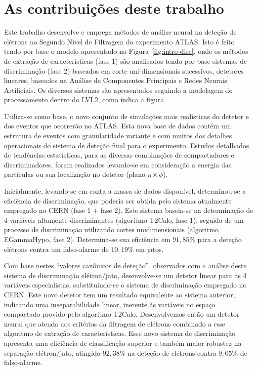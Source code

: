 \section{As contribuições deste trabalho}

Este trabalho desenvolve e emprega métodos de análise neural na deteção de
elétrons no Segundo Nível de Filtragem do experimento ATLAS. Isto é feito
tendo por base o modelo apresentado na Figura~\ref{fig:intro-disc}, onde os
métodos de extração de características (fase 1) são analisados tendo por base
sistemas de discriminação (fase 2) baseados em corte uni-dimensionais
sucessivos, detetores lineares, baseados na Análise de Componentes Principais
e Redes Neurais Artificiais. Os diversos sistemas são apresentados seguindo a
modelagem do processamento dentro do LVL2, como indica a figura.

Utiliza-se como base, o novo conjunto de simulações mais realísticas do
detetor e dos eventos que ocorrerão no ATLAS. Esta nova base de dados contém
um estrutura de eventos com granularidade variante e com muitos dos detalhes
operacionais do sistema de deteção final para o experimento. Estudos
detalhados de tendências estatísticas, para as diversas combinações de
compactadores e discriminadores, foram realizados levando-se em consideração a
energia das partículas ou sua localização no detetor (plano $\eta\times\phi$).

Inicialmente, levando-se em conta a massa de dados disponível, determinou-se a
eficiência de discriminação, que poderia ser obtida pelo sistema atualmente
empregado no CERN (fase 1 $+$ fase 2). Este sistema baseia-se na determinação
de 4 variáveis altamente discriminantes (algoritmo T2Calo, fase 1), seguido de
um processo de discriminação utilizando cortes unidimensionais (algoritmo
EGammaHypo, fase 2). Determina-se sua eficiência em $91,85\%$ para a deteção
elétrons contra um falso-alarme de $10,19\%$ em jatos.

Com base nestes ``valores canônicos de deteção'', observados com a análise
deste sistema de discriminação elétron/jato, desenvolve-se um detetor linear
para as 4 variáveis especialistas, substituindo-se o sistema de discriminação
 empregado no CERN. Este novo detetor tem um resultado
equivalente ao sistema anterior, indicando uma inseparabilidade linear,
inerente às variáveis no espaço compactado provido pelo algoritmo
T2Calo. Desenvolvemos então um detetor neural que atenda aos critérios da
filtragem de elétrons combinado a esse algoritmo de extração de
características. Esse novo sistema de discriminação apresenta uma eficiência
de classificação superior e também maior robustez na separação elétron/jato,
atingido $92,38\%$ na deteção de elétrons contra $9,05\%$ de falso-alarme.


